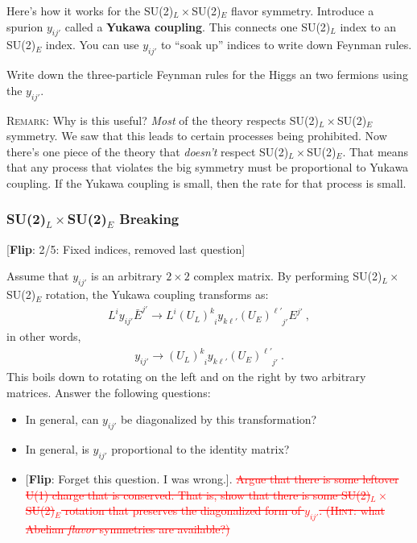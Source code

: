 \documentclass[12pt]{article}
\newcommand{\flip}[1]{{\color{red} [\textbf{Flip}: {#1}]}}
\begin{document}
Here's how it works for the SU(2)$_L\times$SU(2)$_E$ flavor symmetry. Introduce a spurion $y_{ij'}$ called a \textbf{Yukawa coupling}. This connects one SU(2)$_L$ index to an SU(2)$_E$ index. You can use $y_{ij'}$ to ``soak up'' indices to write down Feynman rules.

Write down the three-particle Feynman rules for the Higgs an two fermions using the $y_{ij'}$. 

\textsc{Remark}: Why is this useful? \emph{Most} of the theory respects SU(2)$_L\times$SU(2)$_E$ symmetry. We saw that this leads to certain processes being prohibited. Now there's one piece of the theory that \emph{doesn't} respect SU(2)$_L\times$SU(2)$_E$. That means that any process that violates the big symmetry must be proportional to Yukawa coupling. If the Yukawa coupling is small, then the rate for that process is small. 


\subsubsection{SU(2)$_L\times$SU(2)$_E$ Breaking}

\flip{2/5: Fixed indices, removed last question}

Assume that $y_{ij'}$ is an arbitrary $2\times 2$ complex matrix. By performing SU(2)$_L\times$SU(2)$_E$ rotation, the Yukawa coupling transforms as:
\begin{align}
	L^i y_{ij'}\bar E^{j'} 
	\to 
	L^i (U_L)^k_{\phantom k i} y_{k\ell'} (U_E)^{\ell'}_{\phantom{\ell'} j'} E^{j'} \ ,
\end{align}
in other words, 
\begin{align}
	y_{ij'} \to (U_L)^k_{\phantom k i} y_{k\ell'} (U_E)^{\ell'}_{\phantom{\ell'} j'} \ .
\end{align}
This boils down to rotating on the left and on the right by two arbitrary matrices. Answer the following questions:
\begin{itemize}
	\item In general, can $y_{ij'}$ be diagonalized by this transformation?
	\item In general, is $y_{ij'}$ proportional to the identity matrix?
	\item \flip{Forget this question. I was wrong.}. \textcolor{red}{\sout{Argue that there is some leftover U(1) charge that is conserved. That is, show that there is some SU(2)$_L\times$SU(2)$_E$ rotation that preserves the diagonalized form of $y_{ij'}$. (\textsc{Hint}: what Abelian \emph{flavor} symmetries are available?)}}
\end{itemize}
\end{document}
